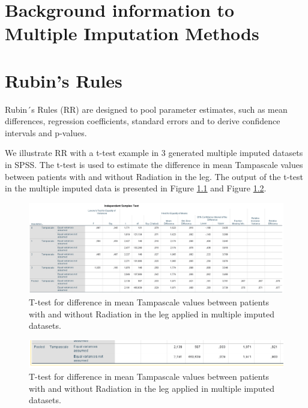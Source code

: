 \documentclass[]{book}
\begin{document}
\chapter*{Background information to Multiple Imputation
Methods}\label{background-information-to-multiple-imputation-methods}

\chapter{Rubin's Rules}\label{rubins-rules}

Rubin´s Rules (RR) are designed to pool parameter estimates, such as
mean differences, regression coefficients, standard errors and to derive
confidence intervals and p-values.

We illustrate RR with a t-test example in 3 generated multiple imputed
datasets in SPSS. The t-test is used to estimate the difference in mean
Tampascale values between patients with and without Radiation in the
leg. The output of the t-test in the multiple imputed data is presented
in Figure \ref{fig:tab9-1} and Figure \ref{fig:tab9-2}.

\begin{figure}

{\centering \includegraphics[width=0.9\linewidth]{images/table5.1} 

}

\caption{T-test for difference in mean Tampascale values between patients with and without Radiation in the leg applied in multiple imputed datasets.}\label{fig:tab9-1}
\end{figure}

\begin{figure}

{\centering \includegraphics[width=0.9\linewidth]{images/table5.1b} 

}

\caption{T-test for difference in mean Tampascale values between patients with and without Radiation in the leg applied in multiple imputed datasets.}\label{fig:tab9-2}
\end{figure}
\end{document}
